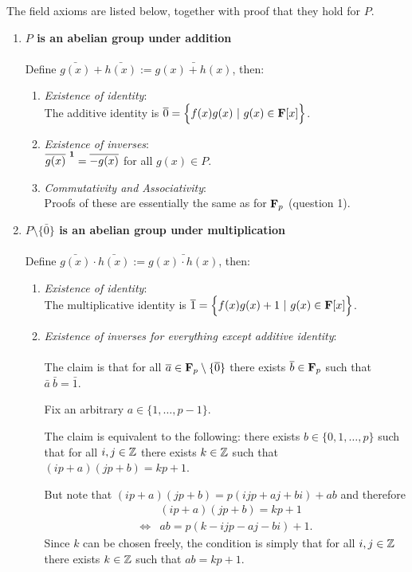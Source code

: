 The field axioms are listed below, together with proof that they hold for $P$.
\begin{enumerate}
\item \textbf{$P$ is an abelian group under addition}\\\\
  Define $\bar{g(x)} + \bar{h(x)} := \bar{g(x) + h(x)}$, then:
  \begin{enumerate}
  \item \textit{Existence of identity}:\\
    The additive identity is $\overline 0 = \Big\{f(x)g(x) ~|~ g(x) \in \mathbf{F}[x]\Big\}$.

  \item \textit{Existence of inverses}:\\
    $\overline{g(x)}^{~{\mathbf 1}} = \overline{-g(x)}$ for all $g(x) \in P$.
  \item \textit{Commutativity and Associativity}:\\
    Proofs of these are essentially the same as for $\mathbf{F}_p$ (question 1).
  \end{enumerate}
\item \textbf{$P\setminus\{\bar 0\}$ is an abelian group under multiplication}\\\\
  Define $\bar{g(x)} \cdot \bar{h(x)} := \bar{g(x)\cdot h(x)}$, then:
  \begin{enumerate}
  \item \textit{Existence of identity}:\\
    The multiplicative identity is $\overline 1 = \Big\{f(x)g(x) + 1~|~ g(x) \in \mathbf{F}[x]\Big\}$.

  \item \textit{Existence of inverses for everything except additive identity}:\\\\
    The claim is that for all $\overline a \in \mathbf{F}_p \setminus \{\overline 0\}$ there
    exists $\overline b \in \mathbf{F}_p$ such that $\bar a ~ \bar b = \bar 1$.

    Fix an arbitrary $a \in \{1, \ldots, p-1\}$.

    The claim is equivalent to the following: there exists
    $b \in \{0, 1, \ldots, p\}$ such that for all $i, j \in \mathbb{Z}$ there exists
    $k \in \mathbb{Z}$ such that $(ip + a)(jp + b) = kp + 1$.

    But note that $(ip + a)(jp + b) = p(ijp + aj + bi) + ab$ and therefore
    \begin{align*}
      &(ip + a)(jp + b) = kp + 1\\
      \iff &ab = p(k - ijp - aj - bi) + 1.
    \end{align*}
    Since $k$ can be chosen freely, the condition is simply that for all
    $i, j \in \mathbb{Z}$ there exists $k \in \mathbb{Z}$ such that $ab = kp + 1$.


\end{enumerate}
\end{enumerate}

